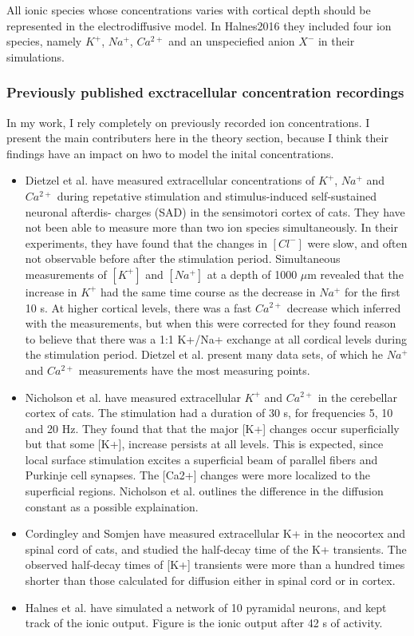 \documentclass{article}
\begin{document}
All ionic species whose concentrations varies with cortical depth should be represented in the electrodiffusive model. In Halnes2016 they included four ion species, namely $K^+$, $Na^+$, $Ca^{2+}$ and an unspeciefied anion $X^-$ in their simulations.

\subsubsection{Previously published exctracellular concentration recordings}
In my work, I rely completely on previously recorded ion concentrations. I present the main contributers here in the theory section, because I think their findings have an impact on hwo to model the inital concentrations. 

\begin{itemize}
\item Dietzel et al. have measured extracellular concentrations of $K^+$, $Na^+$ and $Ca^{2+}$ during repetative stimulation and stimulus-induced self-sustained neuronal afterdis-
charges (SAD) in the sensimotori cortex of cats. They have not been able to measure more than two ion species simultaneously. In their experiments, they have found that the changes in $[Cl^-]$ were slow, and often not observable before after the stimulation period. Simultaneous measurements of $[K^+]$ and $[Na^+]$ at a depth of 1000 $\mu$m revealed that the increase in $K^+$ had the same time course as the decrease in $Na^+$ for the first 10 s. At higher cortical levels, there was a fast $Ca^{2+}$ decrease which inferred with the measurements, but when this were corrected for they found reason to believe that there was a 1:1 K+/Na+ exchange at all cordical levels during the stimulation period. Dietzel et al. present many data sets, of which he $Na^+$ and $Ca^{2+}$ measurements have the most measuring points. 

\item Nicholson et al. have measured extracellular $K^+$ and $Ca^{2+}$ in the cerebellar cortex of cats. The stimulation had a duration of 30 s, for frequencies 5, 10 and 20 Hz. They found that that the major [K+] changes occur superficially but that some [K+], increase persists at all levels. This is expected, since local surface stimulation excites a superficial beam of parallel fibers and Purkinje cell synapses. The [Ca2+] changes were more localized to the superficial regions. Nicholson et al. outlines the difference in the diffusion constant as a possible explaination.

\item Cordingley and Somjen have measured extracellular K+ in the neocortex and spinal cord of cats, and studied the half-decay time of the K+ transients. The observed half-decay times of
[K+] transients were more than a hundred times shorter than those calculated for
diffusion either in spinal cord or in cortex. 

\item Halnes et al. have simulated a network of 10 pyramidal neurons, and kept track of the ionic output. Figure is the ionic output after 42 s of activity. 
\end{itemize}
\end{document}
